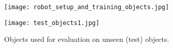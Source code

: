 \documentclass{article}
\begin{document}
\begin{figure}[h]
\centering
\texttt{[image: robot\_setup\_and\_training\_objects.jpg]}
\label{fig:kuka_real_setup}
\end{figure}

\begin{figure}[h]
\centering
\texttt{[image: test\_objects1.jpg]}
\caption{Objects used for evaluation on unseen (test) objects.}
\label{fig:kuka_test_objects}
\end{figure}
\end{document}
